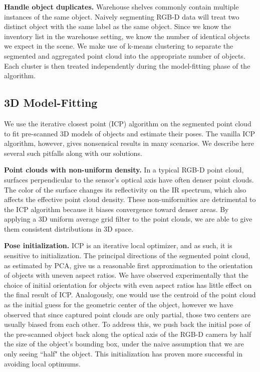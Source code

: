 \documentclass[letterpaper, 10 pt, conference]{ieeeconf}  %
\newcommand{\myparagraph}[1]{\vspace{0.1in}\noindent\textbf{#1}}
\begin{document}
\myparagraph{Handle object duplicates.} 
Warehouse shelves commonly contain multiple instances of the same object. Naively segmenting RGB-D data will treat two distinct object with the same label as the same object. Since we know the inventory list in the warehouse setting, we know the number of identical objects we expect in the scene. 
%
We make use of k-means clustering to separate the segmented and aggregated point cloud into the appropriate number of objects. Each cluster is then treated independently during the model-fitting phase of the algorithm.


\subsection{3D Model-Fitting}
We use the iterative closest point (ICP) algorithm  \cite{gelfand2003geometrically} on the segmented point cloud to fit pre-scanned 3D models of objects and estimate their poses. The vanilla ICP algorithm, however, gives nonsensical results in many scenarios. We describe here several such pitfalls along with our solutions.


\myparagraph{Point clouds with non-uniform density.}
In a typical RGB-D point cloud, surfaces perpendicular to the sensor's optical axis have often denser point clouds. The color of the surface changes its reflectivity on the IR spectrum, which also affects the effective point cloud density.
These non-uniformities are detrimental to the ICP algorithm because it biases convergence toward denser areas.  By applying a 3D uniform average grid filter to the point clouds, we are able to give them consistent distributions in 3D space.


\myparagraph{Pose initialization.} 
ICP is an iterative local optimizer, and as such, it is sensitive to initialization.
The principal directions of the segmented point cloud, as estimated by PCA, give us a reasonable first approximation to the orientation of objects with uneven aspect ratios.
We have observed experimentally that the choice of initial orientation for objects with even aspect ratios has little effect on the final result of ICP.
Analogously, one would use the centroid of the point cloud as the initial guess for the geometric center of the object, however we have observed that since captured point clouds are only partial, those two centers are usually biased from each other.
To address this, we push back the initial pose of the pre-scanned object back along the optical axis of the RGB-D camera by half the size of the object's bounding box, under the naive assumption that we are only seeing ``half" the object. This initialization has proven more successful in avoiding local optimums.
\end{document}
